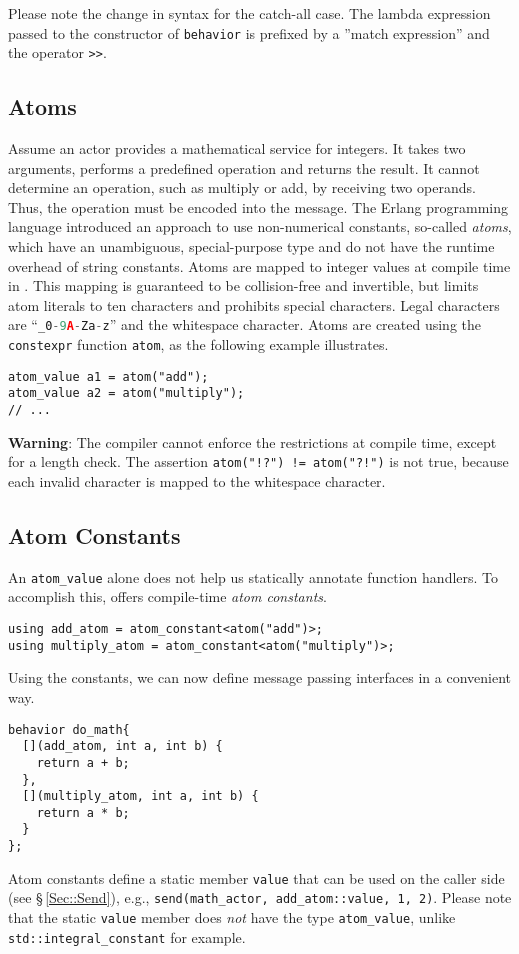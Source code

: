 Please note the change in syntax for the catch-all case.
The lambda expression passed to the constructor of \lstinline^behavior^ is prefixed by a ''match expression'' and the operator \lstinline^>>^.

\subsection{Atoms}
\label{Sec::PatternMatching::Atoms}

Assume an actor provides a mathematical service for integers.
It takes two arguments, performs a predefined operation and returns the result.
It cannot determine an operation, such as multiply or add, by receiving two operands.
Thus, the operation must be encoded into the message.
The Erlang programming language introduced an approach to use non-numerical
constants, so-called \textit{atoms}, which have an unambiguous, special-purpose type and do not have the runtime overhead of string constants.
Atoms are mapped to integer values at compile time in \lib.
This mapping is guaranteed to be collision-free and invertible, but limits atom literals to ten characters and prohibits special characters.
Legal characters are ``\lstinline[language=C++]^_0-9A-Za-z^'' and the whitespace character.
Atoms are created using the \lstinline^constexpr^ function \lstinline^atom^, as the following example illustrates.

\begin{lstlisting}
atom_value a1 = atom("add");
atom_value a2 = atom("multiply");
// ...
\end{lstlisting}

\textbf{Warning}: The compiler cannot enforce the restrictions at compile time, except for a length check.
The assertion \lstinline^atom("!?") != atom("?!")^ is not true, because each invalid character is mapped to the whitespace character.

\subsection{Atom Constants}

An \lstinline^atom_value^ alone does not help us statically annotate function handlers.
To accomplish this, \lib offers compile-time \emph{atom constants}.

\begin{lstlisting}
using add_atom = atom_constant<atom("add")>;
using multiply_atom = atom_constant<atom("multiply")>;
\end{lstlisting}

Using the constants, we can now define message passing interfaces in a convenient way.
\begin{lstlisting}
behavior do_math{
  [](add_atom, int a, int b) {
    return a + b;
  },
  [](multiply_atom, int a, int b) {
    return a * b;
  }
};
\end{lstlisting}

Atom constants define a static member \lstinline^value^ that can be used on the caller side (see \S\,\ref{Sec::Send}), e.g., \lstinline^send(math_actor, add_atom::value, 1, 2)^.
Please note that the static \lstinline^value^ member does \emph{not} have the type \lstinline^atom_value^, unlike \lstinline^std::integral_constant^ for example.